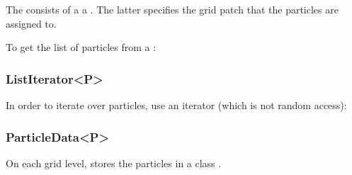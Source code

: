 \documentclass[letterpaper,10pt,english]{sphinxmanual}
\begin{document}
The  consists of a   a .
The latter specifies the grid patch that the particles are assigned to.

To get the list of particles from a :

\begin{sphinxVerbatim}[commandchars=\\\{\},formatcom=\scriptsize]
 

   
\end{sphinxVerbatim}


\subsubsection{ListIterator\textless{}P\textgreater{}}
\label{\detokenize{Source/Particles:listiterator-p}}
In order to iterate over particles, use an iterator  (which is not random access):

\begin{sphinxVerbatim}[commandchars=\\\{\},formatcom=\scriptsize]
 
    
      

\end{sphinxVerbatim}


\subsubsection{ParticleData\textless{}P\textgreater{}}
\label{\detokenize{Source/Particles:particledata-p}}
On each grid level,  stores the particles in a  class .
\end{document}
